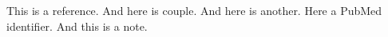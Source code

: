 \documentclass{article}
\begin{document}
This is a reference.
And here is couple.
And here is another.
Here a PubMed identifier.
And this is a note.\cite{note1}





%

\end{document}
